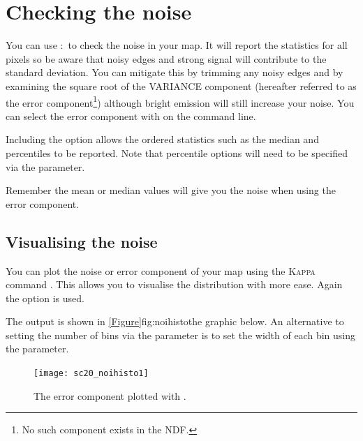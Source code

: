 \documentclass[11pt,oneside,chapters]{starlink}
\begin{document}
\section{Checking the noise}
\label{sec:noise}

You can use \Kappa:\stats\ to check the noise in your map. It will
report the statistics for all pixels so be aware that noisy edges and
strong signal will contribute to the standard deviation. You can
mitigate this by trimming any noisy edges and by examining the square
root of the VARIANCE component (hereafter referred to as the error
component\footnote{No such component exists in the NDF.}) although
bright emission will still increase your noise. You can select the
error component with  on the command line.
\begin{terminalv}
\end{terminalv}
Including the option  allows the ordered statistics such
as the median and percentiles to be reported. Note that percentile
options will need to be specified via the 
parameter.

\begin{tip}
Remember the mean or median values will give you the noise when
using the error component.
\end{tip}

\subsection{Visualising the noise}

You can plot the noise or error component of your map using the
\textsc{Kappa} command \histogram. This allows you to visualise the
distribution with more ease. Again the  option is
used.
\begin{terminalv}
\end{terminalv}
The output is shown in \cref{Figure}{fig:noihisto}{the graphic below}.
An alternative to setting the number of bins via the 
parameter is to set the width of each bin using the 
parameter.

\begin{figure}[h!]
\begin{center}
\texttt{[image: sc20\_noihisto1]}
\caption[
  A histogram of the error component.]{\label{fig:noihisto}
  The error component plotted with \histogram.}
\end{center}
\end{figure}
\end{document}
